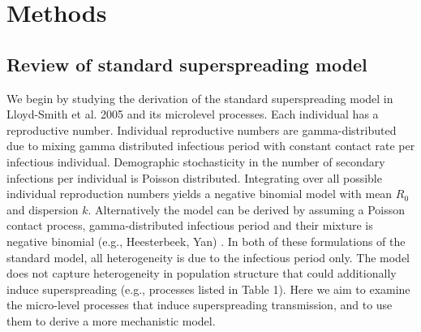 \documentclass{imammb}
\numberwithin{equation}{section}
\begin{document}
\section{Methods}

\subsection{Review of standard superspreading model}

We begin by studying the derivation of the standard superspreading model in Lloyd-Smith et al. 2005 and its microlevel processes. 
Each individual has a reproductive number. Individual reproductive numbers are gamma-distributed due to mixing gamma distributed infectious period with constant contact rate per infectious individual. Demographic stochasticity in the number of secondary infections per individual is Poisson distributed. Integrating over all possible individual reproduction numbers yields a negative binomial model with mean $R_0$ and dispersion $k$. Alternatively the model can be derived by assuming a Poisson contact process, gamma-distributed infectious period and their mixture is negative binomial (e.g., Heesterbeek, Yan) . In both of these formulations of the standard model, all heterogeneity is due to the infectious period only. The model does not capture heterogeneity in population structure that could additionally induce superspreading (e.g., processes listed in Table 1). Here we aim to examine the micro-level processes that induce superspreading transmission, and to use them to derive a more mechanistic model. 

\end{document}
